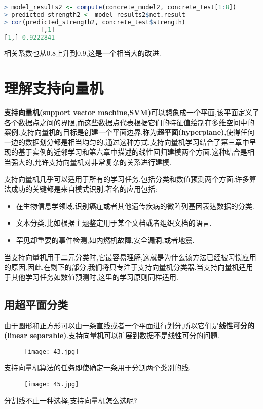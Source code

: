\documentclass[11pt,a4paper,oneside]{book}
\begin{document}
\begin{lstlisting}[language=r]
> model_results2 <- compute(concrete_model2, concrete_test[1:8])
> predicted_strength2 <- model_results2$net.result
> cor(predicted_strength2, concrete_test$strength)
          [,1]
[1,] 0.9222841
\end{lstlisting}
相关系数也从0.8上升到0.9,这是一个相当大的改进.

\section{理解支持向量机}
\textbf{支持向量机(support vector machine,SVM)}可以想象成一个平面,该平面定义了各个数据点之间的界限,而这些数据点代表根据它们的特征值绘制在多维空间中的案例.支持向量机的目标是创建一个平面边界,称为\textbf{超平面(hyperplane)},使得任何一边的数据划分都是相当均匀的.通过这种方式,支持向量机学习结合了第三章中呈现的基于实例的近邻学习和第六章中描述的线性回归建模两个方面,这种结合是相当强大的,允许支持向量机对非常复杂的关系进行建模.

支持向量机几乎可以适用于所有的学习任务,包括分类和数值预测两个方面.许多算法成功的关键都是来自模式识别.著名的应用包括:
\begin{itemize}
	\item 在生物信息学领域,识别癌症或者其他遗传疾病的微阵列基因表达数据的分类.
	\item 文本分类,比如根据主题鉴定用于某个文档或者组织文档的语言.
	\item 罕见却重要的事件检测,如内燃机故障,安全漏洞,或者地震.
\end{itemize}
当支持向量机用于二元分类时,它最容易理解,这就是为什么该方法已经被习惯应用的原因.因此,在剩下的部分,我们将只专注于支持向量机分类器.当支持向量机适用于其他学习任务如数值预测时,这里的学习原则同样适用.

\subsection{用超平面分类}
由于圆形和正方形可以由一条直线或者一个平面进行划分,所以它们是\textbf{线性可分的(linear separable)}.支持向量机可以扩展到数据不是线性可分的问题.

\begin{figure}[H]
	\centering
	\texttt{[image: 43.jpg]}
\end{figure}
支持向量机算法的任务即使确定一条用于分割两个类别的线.
\begin{figure}[H]
	\centering
	\texttt{[image: 45.jpg]}
\end{figure}
分割线不止一种选择,支持向量机怎么选呢?
\end{document}
